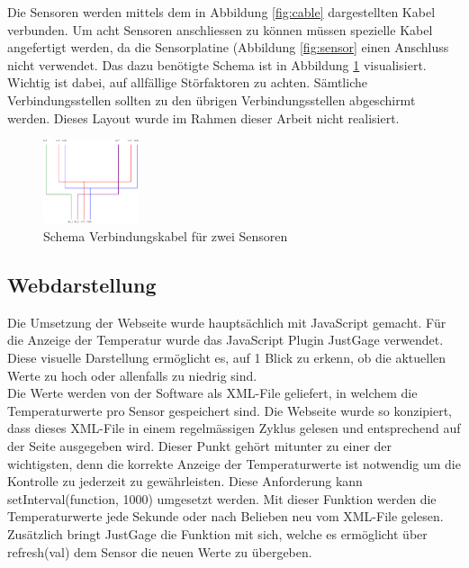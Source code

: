 Die Sensoren werden mittels dem in Abbildung \ref{fig:cable} dargestellten Kabel verbunden. Um acht Sensoren anschliessen zu können müssen spezielle Kabel angefertigt werden, da die Sensorplatine (Abbildung \ref{fig:sensor} einen Anschluss nicht verwendet. Das dazu benötigte Schema ist in Abbildung \ref{fig:schema_doppelsensor} visualisiert. Wichtig ist dabei, auf allfällige Störfaktoren zu achten. Sämtliche Verbindungsstellen sollten zu den übrigen Verbindungsstellen abgeschirmt werden. Dieses Layout wurde im Rahmen dieser Arbeit nicht realisiert.

\begin{figure}[H]%
\centering
\includegraphics[width=0.25\textwidth]{Images/Schema.png}
\caption{Schema Verbindungskabel für zwei Sensoren}
\label{fig:schema_doppelsensor}
\end{figure}

\subsection{Webdarstellung}
Die Umsetzung der Webseite wurde hauptsächlich mit JavaScript gemacht.
Für die Anzeige der Temperatur wurde das JavaScript Plugin JustGage verwendet. Diese visuelle Darstellung ermöglicht es, auf 1 Blick zu erkenn, ob die aktuellen Werte zu hoch oder allenfalls zu niedrig sind.\\

Die Werte werden von der Software als XML-File geliefert, in welchem die Temperaturwerte pro Sensor gespeichert sind. Die Webseite wurde so konzipiert, dass dieses XML-File in einem regelmässigen Zyklus gelesen und entsprechend auf der Seite ausgegeben wird. Dieser Punkt gehört mitunter zu einer der wichtigsten, denn die korrekte Anzeige der Temperaturwerte ist notwendig um die Kontrolle zu jederzeit zu gewährleisten. Diese Anforderung kann setInterval(function, 1000) umgesetzt werden. Mit dieser Funktion werden die Temperaturwerte jede Sekunde oder nach Belieben neu vom XML-File gelesen.
Zusätzlich bringt JustGage die Funktion mit sich, welche es ermöglicht über refresh(val) dem Sensor die neuen Werte zu übergeben.\\


